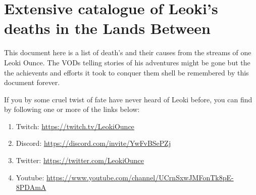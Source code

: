\section*{Extensive catalogue of Leoki's deaths in the Lands Between}

This document here is a list of death's and their causes from the streams of one Leoki Ounce. The VODs telling stories of his adventures might be gone but the the achievents and efforts it took to conquer them shell be remembered by this document forever.

If you by some cruel twist of fate have never heard of Leoki before, you can find by following one or more of the links below:
\begin{enumerate}[label = \textbullet]
    \item Twitch: \href{https://twitch.tv/LeokiOunce}{https://twitch.tv/LeokiOunce}
    \item Discord: \href{https://discord.com/invite/YwFvBSePZj}{https://discord.com/invite/YwFvBSePZj}
    \item Twitter: \href{https://twitter.com/LeokiOunce}{https://twitter.com/LeokiOunce}
    \item Youtube: \href{https://www.youtube.com/channel/UCrnSxwJMFonTk8pE-8PDAmA}{https://www.youtube.com/channel/UCrnSxwJMFonTk8pE-8PDAmA}
\end{enumerate}